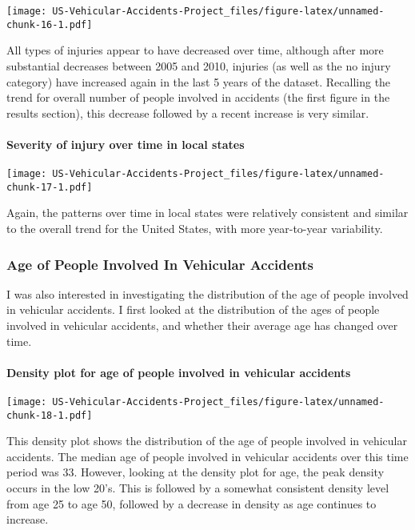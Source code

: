 \documentclass[]{article}
\let\oldparagraph\paragraph
\renewcommand{\paragraph}[1]{\oldparagraph{#1}\mbox{}}
\begin{document}
\texttt{[image: US-Vehicular-Accidents-Project\_files/figure-latex/unnamed-chunk-16-1.pdf]}

All types of injuries appear to have decreased over time, although after
more substantial decreases between 2005 and 2010, injuries (as well as
the no injury category) have increased again in the last 5 years of the
dataset. Recalling the trend for overall number of people involved in
accidents (the first figure in the results section), this decrease
followed by a recent increase is very similar.

\hypertarget{severity-of-injury-over-time-in-local-states}{%
\paragraph{Severity of injury over time in local
states}\label{severity-of-injury-over-time-in-local-states}}

\texttt{[image: US-Vehicular-Accidents-Project\_files/figure-latex/unnamed-chunk-17-1.pdf]}

Again, the patterns over time in local states were relatively consistent
and similar to the overall trend for the United States, with more
year-to-year variability.

\hypertarget{age-of-people-involved-in-vehicular-accidents}{%
\subsubsection{Age of People Involved In Vehicular
Accidents}\label{age-of-people-involved-in-vehicular-accidents}}

I was also interested in investigating the distribution of the age of
people involved in vehicular accidents. I first looked at the
distribution of the ages of people involved in vehicular accidents, and
whether their average age has changed over time.

\hypertarget{density-plot-for-age-of-people-involved-in-vehicular-accidents}{%
\paragraph{Density plot for age of people involved in vehicular
accidents}\label{density-plot-for-age-of-people-involved-in-vehicular-accidents}}

\texttt{[image: US-Vehicular-Accidents-Project\_files/figure-latex/unnamed-chunk-18-1.pdf]}

This density plot shows the distribution of the age of people involved
in vehicular accidents. The median age of people involved in vehicular
accidents over this time period was 33. However, looking at the density
plot for age, the peak density occurs in the low 20's. This is followed
by a somewhat consistent density level from age 25 to age 50, followed
by a decrease in density as age continues to increase.
\end{document}
